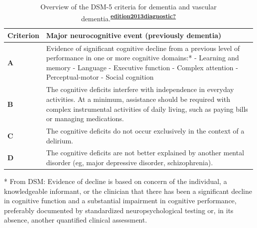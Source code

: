 \documentclass[a4paper, twoside]{templates/ociamthesis}
\begin{document}
\begin{table}[H]

\caption[Overview of the DSM-5 criteria for dementia and vascular dementia.]{\label{tab:diagnosticCriteria-table}Overview of the DSM-5 criteria for dementia and vascular dementia.\textsuperscript{\protect\hyperlink{ref-edition2013diagnostic}{\textbf{edition2013diagnostic?}}}}
\centering
\begin{threeparttable}
\begin{tabular}[t]{>{\centering\arraybackslash}p{5em}>{\raggedright\arraybackslash}p{27em}}
\toprule
\textbf{Criterion} & \textbf{Major neurocognitive event (previously dementia)}\\
\midrule
\textbf{A} & Evidence of significant cognitive decline from a previous level of performance in one or more cognitive domains:* \newline - Learning and memory \newline - Language \newline - Executive function \newline - Complex attention \newline - Perceptual-motor \newline - Social cognition \newline\\
\midrule
\textbf{B} & The cognitive deficits interfere with independence in everyday activities. At a minimum, assistance should be required with complex instrumental activities of daily living, such as paying bills or managing medications. \newline\\
\midrule
\textbf{C} & The cognitive deficits do not occur exclusively in the context of a delirium. \newline\\
\midrule
\textbf{D} & The cognitive deficits are not better explained by another mental disorder (eg, major depressive disorder, schizophrenia). \newline\\
\bottomrule
\end{tabular}
\begin{tablenotes}
\item[*] From DSM: Evidence of decline is based on concern of the individual, a knowledgeable informant, or the clinician that there has been a significant decline in cognitive function and a substantial impairment in cognitive performance, preferably documented by standardized neuropsychological testing or, in its absence, another quantified clinical assessment.
\end{tablenotes}
\end{threeparttable}
\end{table}
\end{document}
